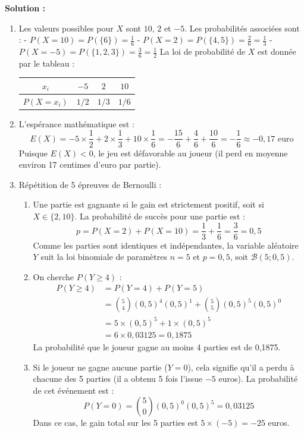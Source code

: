 \textbf{Solution :}
\begin{enumerate}
    \item Les valeurs possibles pour $X$ sont $10$, $2$ et $-5$. Les probabilités associées sont :
    - $P(X = 10) = P(\{6\}) = \frac{1}{6}$
    - $P(X = 2) = P(\{4, 5\}) = \frac{2}{6} = \frac{1}{3}$
    - $P(X = -5) = P(\{1, 2, 3\}) = \frac{3}{6} = \frac{1}{2}$
    La loi de probabilité de $X$ est donnée par le tableau :
    \begin{center}
    \begin{tabular}{|c|c|c|c|}
    \hline
    $x_i$ & $-5$ & $2$ & $10$ \\
    \hline
    $P(X = x_i)$ & $1/2$ & $1/3$ & $1/6$ \\
    \hline
    \end{tabular}
    \end{center}
    
    \item L'espérance mathématique est :
    \[
    E(X) = -5 \times \frac{1}{2} + 2 \times \frac{1}{3} + 10 \times \frac{1}{6} = -\frac{15}{6} + \frac{4}{6} + \frac{10}{6} = -\frac{1}{6} \approx -0,17 \text{ euro}
    \]
    Puisque $E(X) < 0$, le jeu est défavorable au joueur (il perd en moyenne environ 17 centimes d'euro par partie).
    
    \item Répétition de 5 épreuves de Bernoulli :
    \begin{enumerate}
        \item Une partie est gagnante si le gain est strictement positif, soit si $X \in \{2, 10\}$. La probabilité de succès pour une partie est :
        \[
        p = P(X = 2) + P(X = 10) = \frac{1}{3} + \frac{1}{6} = \frac{3}{6} = 0,5
        \]
        Comme les parties sont identiques et indépendantes, la variable aléatoire $Y$ suit la loi binomiale de paramètres $n = 5$ et $p = 0,5$, soit $\mathcal{B}(5; 0,5)$.
        
        \item On cherche $P(Y \ge 4)$ :
        \[
        \begin{aligned}
        P(Y \ge 4) &= P(Y = 4) + P(Y = 5) \\
        &= \binom{5}{4} (0,5)^4 (0,5)^1 + \binom{5}{5} (0,5)^5 (0,5)^0 \\
        &= 5 \times (0,5)^5 + 1 \times (0,5)^5 \\
        &= 6 \times 0,03125 = 0,1875
        \end{aligned}
        \]
        La probabilité que le joueur gagne au moins 4 parties est de 0,1875.
        
        \item Si le joueur ne gagne aucune partie ($Y=0$), cela signifie qu'il a perdu à chacune des 5 parties (il a obtenu 5 fois l'issue $-5$ euros). La probabilité de cet événement est :
        \[
        P(Y = 0) = \binom{5}{0} (0,5)^0 (0,5)^5 = 0,03125
        \]
        Dans ce cas, le gain total sur les 5 parties est $5 \times (-5) = -25$ euros.
    \end{enumerate}
\end{enumerate}
